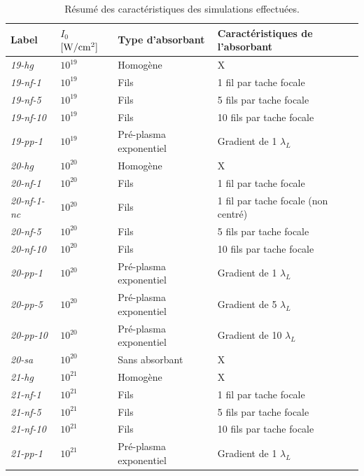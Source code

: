 \begin{refsection}
\begin{table}
    \centering
    \begin{tabular}{ | l | l | l | l | }
    \hline
    Label         & $I_0$ $\rm [W/cm^2]$ & Type d'absorbant & Caractéristiques de l'absorbant \\
    \hline
    \textit{19-hg}      & $10^{19}$     & Homogène          & X \\
    \textit{19-nf-1}    & $10^{19}$     & Fils              & 1 fil par tache focale\\
    \textit{19-nf-5}    & $10^{19}$     & Fils              & 5 fils par tache focale \\
    \textit{19-nf-10}   & $10^{19}$     & Fils              & 10 fils par tache focale \\
    \textit{19-pp-1}    & $10^{19}$     & Pré-plasma exponentiel & Gradient de 1 $\lambda_L$\\
    \textit{20-hg}      & $10^{20}$     & Homogène          & X \\
    \textit{20-nf-1}    & $10^{20}$     & Fils              & 1 fil par tache focale \\
    \textit{20-nf-1-nc} & $10^{20}$     & Fils              & 1 fil par tache focale (non centré) \\
    \textit{20-nf-5}    & $10^{20}$     & Fils              & 5 fils par tache focale \\
    \textit{20-nf-10}   & $10^{20}$     & Fils              & 10 fils par tache focale \\
    \textit{20-pp-1}    & $10^{20}$     & Pré-plasma exponentiel & Gradient de 1 $\lambda_L$\\
    \textit{20-pp-5}    & $10^{20}$     & Pré-plasma exponentiel & Gradient de 5 $\lambda_L$\\
    \textit{20-pp-10}   & $10^{20}$     & Pré-plasma exponentiel& Gradient de 10 $\lambda_L$\\
    \textit{20-sa}      & $10^{20}$     & Sans absorbant    & X \\
    \textit{21-hg}      & $10^{21}$     & Homogène          & X\\
    \textit{21-nf-1}    & $10^{21}$     & Fils              & 1 fil par tache focale \\
    \textit{21-nf-5}    & $10^{21}$     & Fils              & 5 fils par tache focale \\
    \textit{21-nf-10}   & $10^{21}$     & Fils              & 10 fils par tache focale \\
    \textit{21-pp-1}    & $10^{21}$     & Pré-plasma exponentiel & Gradient de 1 $\lambda_L$\\
    \hline
    \end{tabular}
    \caption{Résumé des caractéristiques des simulations effectuées.}
    \label{tab:62-codes_simu}
\end{table}


\end{refsection}
